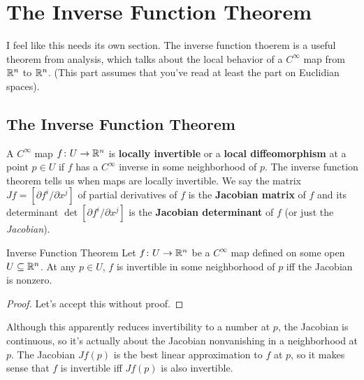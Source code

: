 \section{The Inverse Function Theorem}
I feel like this needs its own section. The inverse function thoerem is a useful theorem from analysis, which talks about the local behavior of a $C^{\infty}$ map from $\mathbb{R}^n $ to $\mathbb{R}^n $. (This part assumes that you've read at least the part on Euclidian spaces).
\subsection{The Inverse Function Theorem}
A $C^{\infty}$ map $f \colon U \to \mathbb{R}^n $ is \textbf{locally invertible} or a \textbf{local diffeomorphism} at a point $p \in U$ if $f$ has a $C^{\infty}$ inverse in some neighborhood of $p$. The inverse function theorem tells us when maps are locally invertible. We say the matrix $Jf= [\partial f^i  / \partial x^j ]$ of partial derivatives of $f$ is the \textbf{Jacobian matrix} of $f$ and its determinant $\det [\partial f^i /\partial x^j ]$ is the \textbf{Jacobian determinant} of $f$ (or just the \emph{Jacobian}).
\begin{namedthm}{Inverse Function Theorem}
   Let $f \colon U \to \mathbb{R}^n $ be a $C^{\infty}$ map defined on some open $U \subseteq \mathbb{R}^n $. At any $p \in U$, $f$ is invertible in some neighborhood of $p$ iff the Jacobian is nonzero.
\end{namedthm}
\begin{proof}
    Let's accept this without proof.
\end{proof}
Although this apparently reduces invertibility to a number at $p$, the Jacobian is continuous, so it's actually about the Jacobian nonvanishing in a neighborhood at $p$. The Jacobian $Jf(p)$ is the best linear approximation to $f$ at $p$, so it makes sense that $f$ is invertible iff $Jf(p)$ is also invertible.

